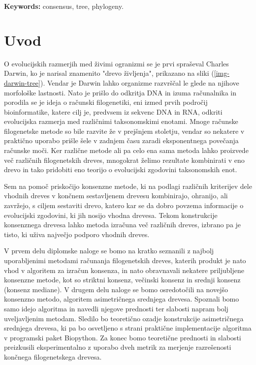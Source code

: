 \documentclass[a4paper, 12pt]{book}
\newcommand{\tkeywordsEn}{consensus, tree, phylogeny}
\newcommand{\clearemptydoublepage}{\newpage{\pagestyle{empty}\cleardoublepage}}
\begin{document}
\noindent\textbf{Keywords:} \tkeywordsEn.
\clearemptydoublepage

\mainmatter
\setcounter{page}{1}
\pagestyle{fancy}

\chapter{Uvod}
O evolucijskih razmerjih med živimi ogranizmi se je prvi spraševal Charles Darwin, ko je narisal znamenito "drevo življenja", prikazano na sliki (\ref{img-darwin-tree}). Vendar je Darwin lahko organizme razvrščal le glede na njihove morfološke lastnosti. Nato je prišlo do odkritja DNA in izuma računalnika in porodila se je ideja o računski filogenetiki, eni izmed prvih področij bioinformatike, katere cilj je, predvsem iz sekvenc DNA in RNA, odkriti evolucijska razmerja med različnimi taksonomskimi enotami.  Mnoge računske filogenetske metode so bile razvite že v prejšnjem stoletju, vendar so nekatere v praktično uporabo prišle šele v zadnjem času zaradi eksponentnega povečanja računske moči. Ker različne metode ali pa celo ena sama metoda lahko proizvede več različnih filogenetskih dreves, mnogokrat želimo rezultate kombinirati v eno drevo in tako pridobiti eno teorijo o evolucijski zgodovini taksonomskih enot. 

Sem na pomoč priskočijo konsenzne metode, ki na podlagi različnih  kriterijev dele vhodnih dreves v končnem sestavljenem drevesu kombinirajo, ohranijo, ali zavržejo, s ciljem sestaviti drevo, katero kar se da dobro povzema informacije o evolucijski zgodovini, ki jih nosijo vhodna drevesa. Tekom konstrukcije konsenznega drevesa lahko metoda izračuna več različnih dreves, izbrano pa je tisto, ki uživa največjo podporo vhodnih dreves.

V prvem delu diplomske naloge se bomo na kratko seznanili z najbolj uporabljenimi metodami računanja filogenetskih dreves, katerih produkt je nato vhod v algoritem za izračun konsenza, in nato obravnavali nekatere priljubljene konsenzne metode, kot so striktni konsenz, večinski konsenz in srednji konsenz (konsenz mediane). V drugem delu naloge se bomo osredotočili na novejšo konsenzno metodo, algoritem asimetričnega srednjega drevesa. Spoznali bomo samo idejo algoritma in navedli njegove prednosti ter slabosti napram bolj uveljavljenim metodam. Sledilo bo teoretično ozadje konstrukcije asimetričnega srednjega drevesa, ki pa bo osvetljeno s strani praktične implementacije algoritma v programski paket Biopython. Za konec bomo teoretične prednosti in slabosti preizkusili eksperimentalno z uporabo dveh metrik za merjenje razrešenosti končnega filogenetskega drevesa.
\end{document}

